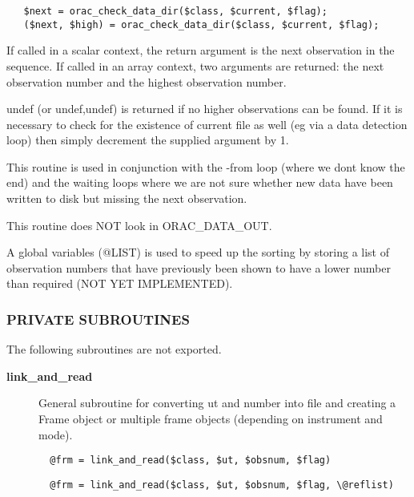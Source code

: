\begin{description}
\begin{description}
\begin{description}
\begin{verbatim}
   $next = orac_check_data_dir($class, $current, $flag);
   ($next, $high) = orac_check_data_dir($class, $current, $flag);
\end{verbatim}


If called in a scalar context, the return argument is the next
observation in the sequence. If called in an array context, two
arguments are returned: the next observation number and the highest
observation number.



undef (or undef,undef) is returned if no higher observations can be
found. If it is necessary to check for the existence of current
file as well (eg via a data detection loop) then simply decrement the
supplied argument by 1.



This routine is used in conjunction with the -from loop (where we
dont know the end) and the waiting loops where we are not sure whether
new data have been written to disk but missing the next observation.



This routine does NOT look in ORAC\_DATA\_OUT.



A global variables (@LIST) is used to speed up the sorting by storing
a list of observation numbers that have previously been shown to have a lower
number than required (NOT YET IMPLEMENTED).

\end{description}
\subsubsection*{PRIVATE SUBROUTINES\label{ORAC::Loop_PRIVATE_SUBROUTINES}}


The following subroutines are not exported.

\begin{description}

\item[{\textbf{link\_and\_read}}] \mbox{}

General subroutine for converting ut and number into file
and creating a Frame object or multiple frame objects (depending
on instrument and mode).

\begin{verbatim}
  @frm = link_and_read($class, $ut, $obsnum, $flag)
\end{verbatim}
\begin{verbatim}
  @frm = link_and_read($class, $ut, $obsnum, $flag, \@reflist)
\end{verbatim}



\end{description}
\end{description}
\end{description}

